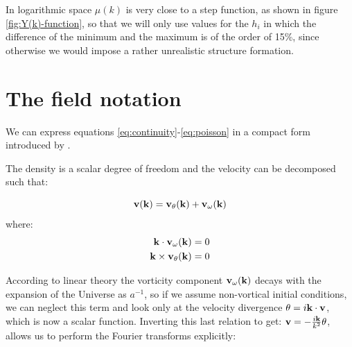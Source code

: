 In logarithmic space $\mu(k)$ is very close to a step function, as
shown in figure \ref{fig:Y(k)-function}, so that we will only use
values for the $h_{i}$ in which the difference of the minimum and
the maximum is of the order of 15\%, since otherwise we would impose
a rather unrealistic structure formation.





\section{The field notation\label{sec:The-field-notation}}


We can express equations \ref{eq:continuity}-\ref{eq:poisson} in a compact
form introduced by \cite{scoccimarro_new_2000}.

The density is a scalar degree of freedom and the velocity can be
decomposed such that:

\begin{equation}
\mathbf{v}(\mathbf{k})=\mathbf{v}_{\theta}(\mathbf{k})+\mathbf{v{}_{\omega}}(\mathbf{k})
\end{equation}
where:
\begin{align*}
\mathbf{k}\cdot\mathbf{v_{\omega}}(\mathbf{k}) & =0\\
\mathbf{k}\times\mathbf{v_{\theta}}(\mathbf{k}) & =0
\end{align*}


According to linear theory the vorticity component $\mathbf{v{}_{\omega}}(\mathbf{k})$
decays with the expansion of the Universe as $a^{-1}$, so if we assume
non-vortical initial conditions, we can neglect this term and look
only at the velocity divergence $\theta=i\mathbf{k}\cdot\mathbf{v}$, which
is now a scalar function. Inverting this last relation to get: $\mathbf{v}=-\frac{i\mathbf{k}}{k^{2}}\theta$,
allows us to perform the Fourier transforms explicitly:

